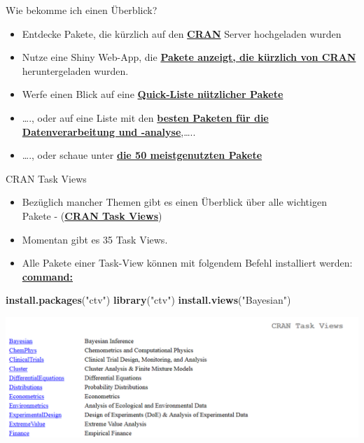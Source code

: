 \documentclass[ignorenonframetext,]{beamer}
\newenvironment{Shaded}{\begin{snugshade}}{\end{snugshade}}
\newcommand{\KeywordTok}[1]{\textcolor[rgb]{0.13,0.29,0.53}{\textbf{#1}}}
\newcommand{\StringTok}[1]{\textcolor[rgb]{0.31,0.60,0.02}{#1}}
\newcommand{\NormalTok}[1]{#1}
\providecommand{\tightlist}{%
  \setlength{\itemsep}{0pt}\setlength{\parskip}{0pt}}
\begin{document}
\begin{frame}{Wie bekomme ich einen Überblick?}

\begin{itemize}
\item
  Entdecke Pakete, die kürzlich auf den
  \href{https://mran.microsoft.com/packages/}{\textbf{CRAN}} Server
  hochgeladen wurden
\item
  Nutze eine Shiny Web-App, die
  \href{https://gallery.shinyapps.io/cran-gauge/}{\textbf{Pakete
  anzeigt, die kürzlich von CRAN}} heruntergeladen wurden.
\item
  Werfe einen Blick auf eine
  \href{https://support.rstudio.com/hc/en-us/articles/201057987-Quick-list-of-useful-R-packages}{\textbf{Quick-Liste
  nützlicher Pakete}}
\item
  \ldots{}., oder auf eine Liste mit den
  \href{http://www.computerworld.com/article/2921176/business-intelligence/great-r-packages-for-data-import-wrangling-visualization.html}{\textbf{besten
  Paketen für die Datenverarbeitung und -analyse}},\ldots{}..
\item
  \ldots{}., oder schaue unter
  \href{https://www.r-bloggers.com/the-50-most-used-r-packages/}{\textbf{die
  50 meistgenutzten Pakete}}
\end{itemize}

\end{frame}

\begin{frame}[fragile]{CRAN Task Views}

\begin{itemize}
\tightlist
\item
  Bezüglich mancher Themen gibt es einen Überblick über alle wichtigen
  Pakete - (\href{https://cran.r-project.org/web/views/}{\textbf{CRAN
  Task Views}})
\item
  Momentan gibt es 35 Task Views.
\item
  Alle Pakete einer Task-View können mit folgendem Befehl installiert
  werden:
  \href{https://mran.microsoft.com/rpackages/}{\textbf{command:}}
\end{itemize}

\begin{Shaded}
\begin{Highlighting}[]
\KeywordTok{install.packages}\NormalTok{(}\StringTok{"ctv"}\NormalTok{)}
\KeywordTok{library}\NormalTok{(}\StringTok{"ctv"}\NormalTok{)}
\KeywordTok{install.views}\NormalTok{(}\StringTok{"Bayesian"}\NormalTok{)}
\end{Highlighting}
\end{Shaded}

\includegraphics{figure/CRANtaskViews.PNG}

\end{frame}
\end{document}
